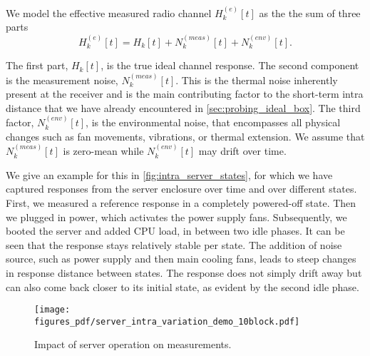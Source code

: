 \documentclass[conference]{IEEEtran}
\begin{document}
\newcommand{\effChannel}{H^{(e)}_k[t]}
\newcommand{\trueChannel}{H_k[t]}
\newcommand{\envNoise}{N_k^{(env)}[t]}
\newcommand{\measNoise}{N_k^{(meas)}[t]}

We model the effective measured radio channel $\effChannel$ as the the sum of three parts
\begin{equation}
\effChannel = \trueChannel  + \measNoise + \envNoise.
\end{equation}

The first part, $\trueChannel$, is the true ideal channel response. The second component is the measurement noise, $\measNoise$. This is the thermal noise inherently present at the receiver and is the main contributing factor to the short-term intra distance that we have already encountered in \autoref{sec:probing_ideal_box}. The third factor, $\envNoise$, is the environmental noise, that encompasses all physical changes such as fan movements, vibrations, or thermal extension. We assume that $\measNoise$ is zero-mean while $\envNoise$ may drift over time.

We give an example for this in \autoref{fig:intra_server_states}, for which we have captured responses from the server enclosure over time and over different states. First, we measured a reference response in a completely powered-off state. Then we plugged in power, which activates the power supply fans. Subsequently, we booted the server and added CPU load, in between two idle phases. It can be seen that the response stays relatively stable per state. The addition of noise source, such as power supply and then main cooling fans, leads to steep changes in response distance between states. The response does not simply drift away but can also come back closer to its initial state, as evident by the second idle phase.





\begin{figure}
\centering
\texttt{[image: figures\_pdf/server\_intra\_variation\_demo\_10block.pdf]}
\caption{Impact of server operation on measurements.}
\label{fig:intra_server_states}
\end{figure}
\end{document}
